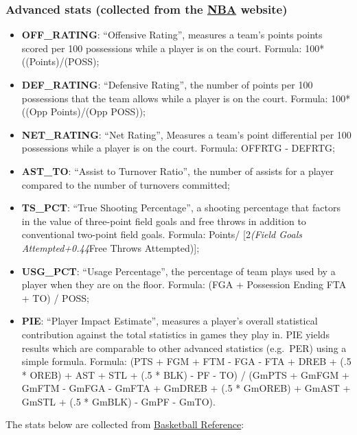 \documentclass[
]{article}
\providecommand{\tightlist}{%
  \setlength{\itemsep}{0pt}\setlength{\parskip}{0pt}}
\begin{document}
\hypertarget{advanced-stats-collected-from-the-nba-website}{%
\subsubsection{\texorpdfstring{Advanced stats (collected from the
\href{https://www.nba.com/?47}{NBA}
website)}{Advanced stats (collected from the NBA website)}}\label{advanced-stats-collected-from-the-nba-website}}

\begin{itemize}
\tightlist
\item
  \textbf{OFF\_RATING}: ``Offensive Rating'', measures a team's points
  points scored per 100 possessions while a player is on the court.
  Formula: 100*((Points)/(POSS);
\item
  \textbf{DEF\_RATING}: ``Defensive Rating'', the number of points per
  100 possessions that the team allows while a player is on the court.
  Formula: 100*((Opp Points)/(Opp POSS));
\item
  \textbf{NET\_RATING}: ``Net Rating'', Measures a team's point
  differential per 100 possessions while a player is on the court.
  Formula: OFFRTG - DEFRTG;
\item
  \textbf{AST\_TO}: ``Assist to Turnover Ratio'', the number of assists
  for a player compared to the number of turnovers committed;
\item
  \textbf{TS\_PCT}: ``True Shooting Percentage'', a shooting percentage
  that factors in the value of three-point field goals and free throws
  in addition to conventional two-point field goals. Formula: Points/
  {[}2\emph{(Field Goals Attempted+0.44}Free Throws Attempted){]};
\item
  \textbf{USG\_PCT}: ``Usage Percentage'', the percentage of team plays
  used by a player when they are on the floor. Formula: (FGA +
  Possession Ending FTA + TO) / POSS;
\item
  \textbf{PIE}: ``Player Impact Estimate'', measures a player's overall
  statistical contribution against the total statistics in games they
  play in. PIE yields results which are comparable to other advanced
  statistics (e.g.~PER) using a simple formula. Formula: (PTS + FGM +
  FTM - FGA - FTA + DREB + (.5 * OREB) + AST + STL + (.5 * BLK) - PF -
  TO) / (GmPTS + GmFGM + GmFTM - GmFGA - GmFTA + GmDREB + (.5 * GmOREB)
  + GmAST + GmSTL + (.5 * GmBLK) - GmPF - GmTO).
\end{itemize}

The stats below are collected from
\href{https://www.basketball-reference.com}{Basketball Reference}:
\end{document}
